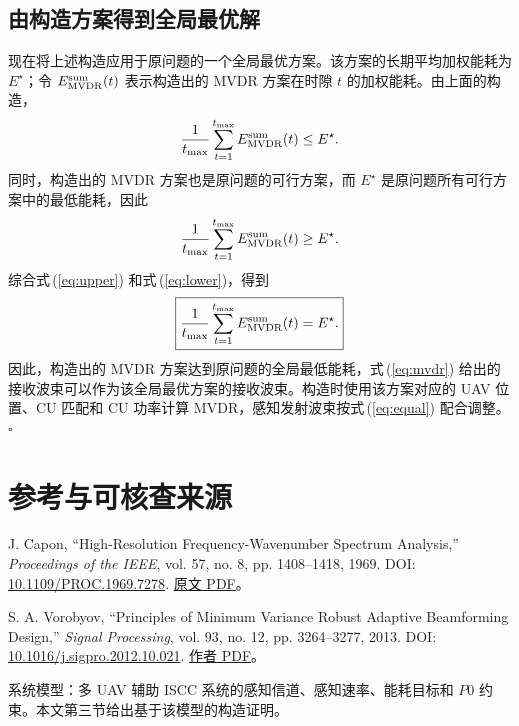 \documentclass[11pt,a4paper]{ctexart}
\begin{document}
\subsection{由构造方案得到全局最优解}
现在将上述构造应用于原问题的一个全局最优方案。该方案的长期平均加权能耗为 $E^\star$；令 $E^{\rm sum}_{\rm MVDR}(t)$ 表示构造出的 MVDR 方案在时隙 $t$ 的加权能耗。由上面的构造，
\begin{equation}\label{eq:upper}
\frac{1}{t_{\max}}\sum_{t=1}^{t_{\max}}E^{\rm sum}_{\rm MVDR}(t)\le E^\star.
\end{equation}
同时，构造出的 MVDR 方案也是原问题的可行方案，而 $E^\star$ 是原问题所有可行方案中的最低能耗，因此
\begin{equation}\label{eq:lower}
\frac{1}{t_{\max}}\sum_{t=1}^{t_{\max}}E^{\rm sum}_{\rm MVDR}(t)\ge E^\star.
\end{equation}
综合式\,(\ref{eq:upper}) 和式\,(\ref{eq:lower})，得到
\begin{equation}
\boxed{\frac{1}{t_{\max}}\sum_{t=1}^{t_{\max}}E^{\rm sum}_{\rm MVDR}(t)=E^\star.}
\end{equation}
因此，构造出的 MVDR 方案达到原问题的全局最低能耗，式\,(\ref{eq:mvdr}) 给出的接收波束可以作为该全局最优方案的接收波束。构造时使用该方案对应的 UAV 位置、CU 匹配和 CU 功率计算 MVDR，感知发射波束按式\,(\ref{eq:equal}) 配合调整。\hfill$\square$

\section*{参考与可核查来源}
\begin{enumerate}[label={[\arabic*]},leftmargin=*]
\item J. Capon, “High-Resolution Frequency-Wavenumber Spectrum Analysis,” \textit{Proceedings of the IEEE}, vol. 57, no. 8, pp. 1408--1418, 1969. DOI: \href{https://doi.org/10.1109/PROC.1969.7278}{10.1109/PROC.1969.7278}. \href{https://epsc.wustl.edu/~ggeuler/reading/cam_noise_biblio/capon_1969-ieee-high-resolution_frequency-wavenumber_spectrum_analysis.pdf}{原文 PDF}。
\item S. A. Vorobyov, “Principles of Minimum Variance Robust Adaptive Beamforming Design,” \textit{Signal Processing}, vol. 93, no. 12, pp. 3264--3277, 2013. DOI: \href{https://doi.org/10.1016/j.sigpro.2012.10.021}{10.1016/j.sigpro.2012.10.021}. \href{https://users.aalto.fi/~vorobys1/SP13.pdf}{作者 PDF}。
\item 系统模型：多 UAV 辅助 ISCC 系统的感知信道、感知速率、能耗目标和 $P0$ 约束。本文第三节给出基于该模型的构造证明。
\end{enumerate}
\end{document}
